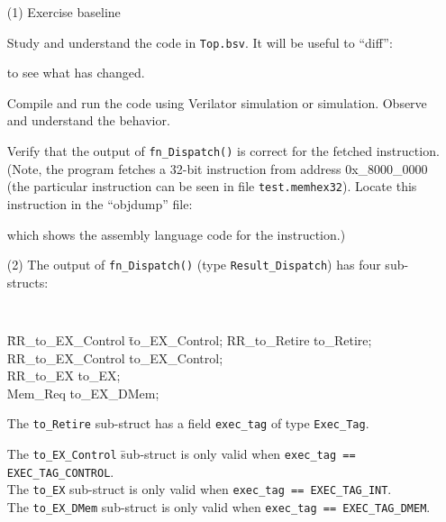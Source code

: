 \begin{itemize}

\item[(1)] Exercise baseline

    Study and understand the code in \verb|Top.bsv|. It will be useful
    to ``diff'':
    to see what has changed.

    Compile and run the code using Verilator simulation or {\BLUESIM}
    simulation.  Observe and understand the behavior.

    Verify that the output of \verb|fn_Dispatch()| is correct for the
    fetched instruction.  (Note, the program fetches a 32-bit
    instruction from address 0x\_8000\_0000 (the particular
    instruction can be seen in file \verb|test.memhex32|).  Locate
    this instruction in the ``objdump'' file:


    which shows the assembly language code for the instruction.)

\item[(2)] The output of \verb|fn_Dispatch()| (type
    \verb|Result_Dispatch|) has four sub-structs:
    {\footnotesize\tt
    \begin{tabbing}
    \hm \= RR\_to\_EX\_Control \hm \= to\_EX\_Control; \kill
        \> RR\_to\_Retire          \> to\_Retire; \\
        \> RR\_to\_EX\_Control     \> to\_EX\_Control; \\
        \> RR\_to\_EX              \> to\_EX; \\
        \> Mem\_Req                \> to\_EX\_DMem;
    \end{tabbing}}

    The \verb|to_Retire| sub-struct has a field \verb|exec_tag| of type
    \verb|Exec_Tag|.
    \begin{tabbing}
    The {\tt to\_EX\_Control} \= sub-struct is only valid when {\tt exec\_tag == EXEC\_TAG\_CONTROL}. \\
    The {\tt to\_EX}          \> sub-struct is only valid when {\tt exec\_tag == EXEC\_TAG\_INT}. \\
    The {\tt to\_EX\_DMem}    \> sub-struct is only valid when {\tt exec\_tag == EXEC\_TAG\_DMEM}.
    \end{tabbing}


\end{itemize}

